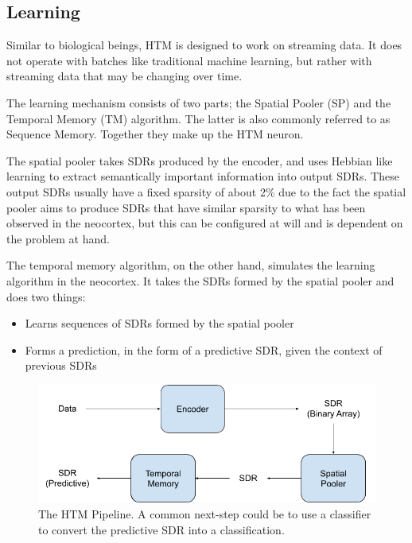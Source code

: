 \subsection{Learning}
Similar to biological beings, HTM is designed to work on streaming data. It does not operate with batches like traditional machine learning, but rather with streaming data that may be changing over time. \par
The learning mechanism consists of two parts; the Spatial Pooler (SP) and the Temporal Memory (TM) algorithm. The latter is also commonly referred to as Sequence Memory. Together they make up the HTM neuron.\par
The spatial pooler takes SDRs produced by the encoder, and uses Hebbian like learning to extract semantically important information into output SDRs. These output SDRs usually have a fixed sparsity of about 2\% due to the fact the spatial pooler aims to produce SDRs that have similar sparsity to what has been observed in the neocortex, but this can be configured at will and is dependent on the problem at hand.\par
The temporal memory algorithm, on the other hand, simulates the learning algorithm in the neocortex. It takes the SDRs formed by the spatial pooler and does two things:
\begin{itemize}
    \item Learns sequences of SDRs formed by the spatial pooler
    \item Forms a prediction, in the form of a predictive SDR,  given the context of previous SDRs
\end{itemize}
\begin{figure}[H]
    \centering
    \includegraphics[width=\linewidth]{resources/related_works/htm_pipeline.png}
    \caption{The HTM Pipeline. A common next-step could be to use a classifier to convert the predictive SDR into a classification. }
    \label{fig:htm_pipeline}
\end{figure}

